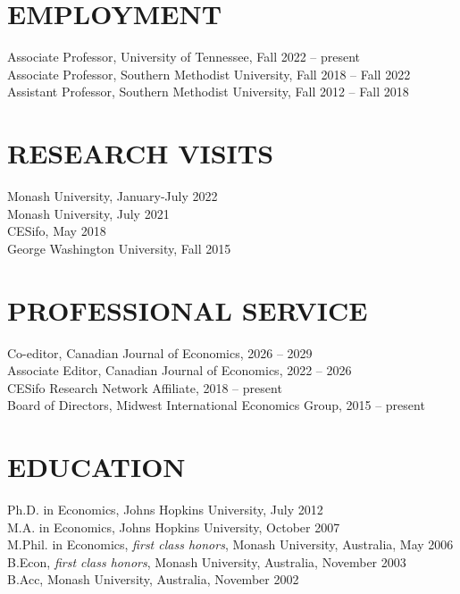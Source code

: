 \documentclass[11pt]{res}
\begin{document}
\begin{resume}
\hspace{-0.5in}\makebox[6.1in]{\hrulefill}

\section{EMPLOYMENT} \vspace{1.5mm}
Associate Professor, University of Tennessee, Fall 2022 -- present\\
Associate Professor, Southern Methodist University, Fall 2018 -- Fall 2022\\
Assistant Professor, Southern Methodist University, Fall 2012 -- Fall 2018

\section{RESEARCH VISITS} \vspace{1.5mm}
Monash University, January-July 2022\vspace{1.5mm}\\
Monash University, July 2021\vspace{1.5mm}\\
CESifo, May 2018\vspace{1.5mm}\\
George Washington University, Fall 2015

\section{PROFESSIONAL SERVICE} \vspace{1.5mm}
Co-editor, Canadian Journal of Economics, 2026 -- 2029 \\
Associate Editor, Canadian Journal of Economics, 2022 -- 2026 \\
CESifo Research Network Affiliate, 2018 --  present\\
Board of Directors, Midwest International Economics Group, 2015 -- present

\section{EDUCATION} \vspace{1.5mm}
Ph.D. in Economics, Johns Hopkins University, July 2012 \vspace{1.5mm}\\
M.A. in Economics, Johns Hopkins University, October 2007\vspace{1.5mm}\\
M.Phil. in Economics, \emph{first class honors}, Monash University, Australia, May 2006\vspace{1.5mm}\\
B.Econ, \emph{first class honors}, Monash University, Australia, November 2003\vspace{1.5mm}\\
B.Acc, Monash University, Australia, November 2002


\end{resume}
\end{document}
